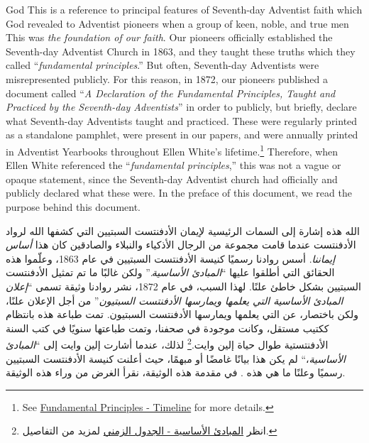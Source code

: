 God  This is a reference to principal features of Seventh-day Adventist faith which God revealed to Adventist pioneers  when a group of keen, noble, and true men  This was \textit{the foundation of our faith}. Our pioneers officially established the Seventh-day Adventist Church in 1863, and they taught these truths which they called “\textit{fundamental principles}.” But often, Seventh-day Adventists were misrepresented publicly. For this reason, in 1872, our pioneers published a document called “\textit{A Declaration of the Fundamental Principles, Taught and Practiced by the Seventh-day Adventists}” in order to publicly, but briefly, declare what  Seventh-day Adventists taught and practiced. These  were regularly printed as a standalone pamphlet, were present in our papers, and were annually printed in Adventist Yearbooks throughout Ellen White's lifetime.\footnote{See \hyperref[appendix:timeline]{Fundamental Principles - Timeline} for more details.} Therefore, when Ellen White referenced the “\textit{fundamental principles},” this was not a vague or opaque statement, since the Seventh-day Adventist church had officially and publicly declared what these  were. In the preface of this document, we read the purpose behind this document.


الله  هذه إشارة إلى السمات الرئيسية لإيمان الأدفنتست السبتيين التي كشفها الله لرواد الأدفنتست  عندما قامت مجموعة من الرجال الأذكياء والنبلاء والصادقين  كان هذا \textit{أساس إيماننا}. أسس روادنا رسميًا كنيسة الأدفنتست السبتيين في عام 1863، وعلّموا هذه الحقائق التي أطلقوا عليها “\textit{المبادئ الأساسية}.” ولكن غالبًا ما تم تمثيل الأدفنتست السبتيين بشكل خاطئ علنًا. لهذا السبب، في عام 1872، نشر روادنا وثيقة تسمى “\textit{إعلان المبادئ الأساسية التي يعلمها ويمارسها الأدفنتست السبتيون}” من أجل الإعلان علنًا، ولكن باختصار، عن  التي يعلمها ويمارسها الأدفنتست السبتيون. تمت طباعة هذه  بانتظام ككتيب مستقل، وكانت موجودة في صحفنا، وتمت طباعتها سنويًا في كتب السنة الأدفنتستية طوال حياة إلين وايت.\footnote{انظر \hyperref[appendix:timeline]{المبادئ الأساسية - الجدول الزمني} لمزيد من التفاصيل.} لذلك، عندما أشارت إلين وايت إلى “\textit{المبادئ الأساسية}،“ لم يكن هذا بيانًا غامضًا أو مبهمًا، حيث أعلنت كنيسة الأدفنتست السبتيين رسميًا وعلنًا ما هي هذه . في مقدمة هذه الوثيقة، نقرأ الغرض من وراء هذه الوثيقة.


